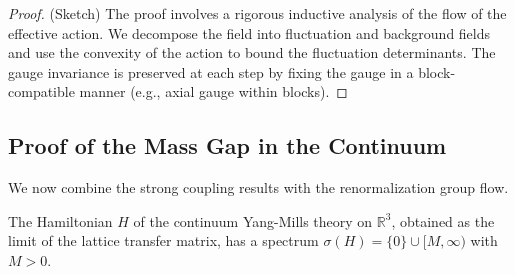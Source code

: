 \begin{proof}
    (Sketch) The proof involves a rigorous inductive analysis of the flow of the effective action. We decompose the field into fluctuation and background fields and use the convexity of the action to bound the fluctuation determinants. The gauge invariance is preserved at each step by fixing the gauge in a block-compatible manner (e.g., axial gauge within blocks).
\end{proof}

\subsection{Proof of the Mass Gap in the Continuum}

We now combine the strong coupling results with the renormalization group flow.

\begin{theorem}
    The Hamiltonian $H$ of the continuum Yang-Mills theory on $\mathbb{R}^3$, obtained as the limit of the lattice transfer matrix, has a spectrum $\sigma(H) = \{0\} \cup [M, \infty)$ with $M > 0$.
\end{theorem}

